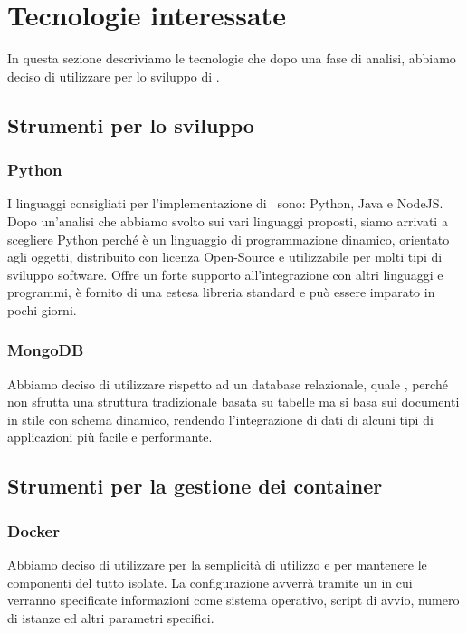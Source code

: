 \section{Tecnologie interessate}
In questa sezione descriviamo le tecnologie che dopo una fase di analisi, abbiamo deciso di utilizzare per lo sviluppo di \progetto.

\subsection{Strumenti per lo sviluppo}

\subsubsection{Python}
I linguaggi consigliati per l'implementazione di \progetto\ sono: Python, Java e NodeJS. Dopo un'analisi che abbiamo svolto sui vari linguaggi proposti, siamo
arrivati a scegliere Python perché è un linguaggio di programmazione dinamico, orientato agli oggetti, distribuito con licenza Open-Source e utilizzabile
per molti tipi di sviluppo software. Offre un forte supporto all'integrazione con altri linguaggi e programmi, è fornito di una estesa libreria standard e
può essere imparato in pochi giorni.


\subsubsection{MongoDB}
Abbiamo deciso di utilizzare  rispetto ad un database relazionale, quale , perché non sfrutta una struttura tradizionale basata su
tabelle ma si basa sui documenti in stile  con schema dinamico, rendendo l’integrazione di dati di alcuni tipi di applicazioni più facile e performante.

\subsection{Strumenti per la gestione dei container}

\subsubsection{Docker}
Abbiamo deciso di utilizzare  per la semplicità di utilizzo e per mantenere le componenti del tutto isolate.
La configurazione avverrà tramite un  in cui verranno specificate informazioni come sistema operativo, script di avvio,
numero di istanze ed altri parametri specifici.

